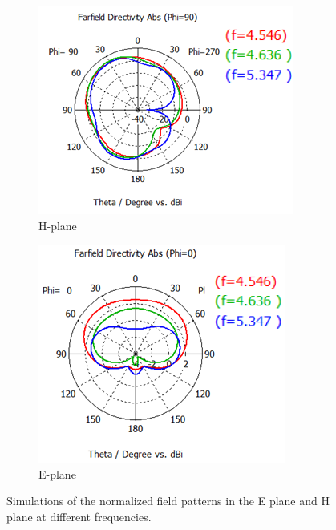 \documentclass[12pt]{suhbook}
\begin{document}
\begin{figure}[hbt!]
\begin{subfigure}{.5\textwidth}
  \centering
  \includegraphics[width=.9\linewidth]{6}
  \caption{H-plane}
  \label{FIG 6}
\end{subfigure}%
\begin{subfigure}{.5\textwidth}
  \centering
  \includegraphics[width=.8\linewidth]{7}
  \caption{E-plane}
  \label{FIG 7}
\end{subfigure}
\caption{Simulations of the normalized field patterns in the E plane and H plane at different frequencies.}
\label{fig:fig}
\end{figure}
% 
% 
% 
\end{document}
